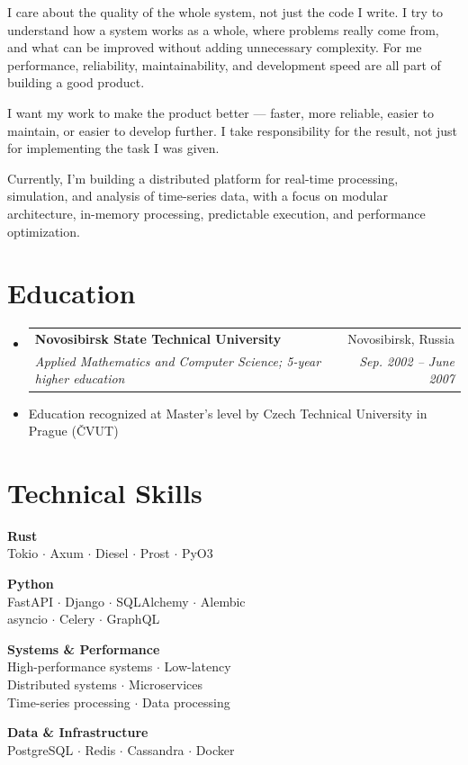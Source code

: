 \documentclass[letterpaper,11pt]{article}
\makeatletter
\newcommand{\resumeSubheading}[4]{
  \vspace{-1pt}\item
    \begin{tabular*}{0.97\textwidth}{l@{\extracolsep{\fill}}r}
      \textbf{#1} & #2 \\
      \textit{\small#3} & \textit{\small #4} \\
    \end{tabular*}\vspace{-5pt}
}
\newcommand{\resumeEducationNote}[1]{
  \vspace{-3pt}
  \item[]\footnotesize{#1}
  \vspace{-3pt}
}
\newcommand{\resumeSubHeadingListStart}{\begin{itemize}[leftmargin=*]}
\newcommand{\resumeSubHeadingListEnd}{\end{itemize}}
\makeatother
\begin{document}
I care about the quality of the whole system, not just the code I write. I try to understand how a system works as a whole, where problems really come from, and what can be improved without adding unnecessary complexity. For me performance, reliability, maintainability, and development speed are all part of building a good product.

I want my work to make the product better — faster, more reliable, easier to maintain, or easier to develop further. I take responsibility for the result, not just for implementing the task I was given.

Currently, I’m building a distributed platform for real-time processing, simulation, and analysis of time-series data, with a focus on modular architecture, in-memory processing, predictable execution, and performance optimization.

\section{Education}
  \resumeSubHeadingListStart
    \resumeSubheading
      {Novosibirsk State Technical University}{Novosibirsk, Russia}
      {Applied Mathematics and Computer Science; 5-year higher education}{Sep. 2002 -- June 2007}
    \resumeEducationNote
      {Education recognized at Master's level by Czech Technical University in Prague (ČVUT)}
  \resumeSubHeadingListEnd


\section{Technical Skills}

\begin{minipage}[t]{0.49\textwidth}
  \textbf{Rust}\\
  Tokio $\cdot$ Axum $\cdot$ Diesel $\cdot$ Prost $\cdot$ PyO3
\end{minipage}
\hfill
\begin{minipage}[t]{0.49\textwidth}
  \textbf{Python}\\
  FastAPI $\cdot$ Django $\cdot$ SQLAlchemy $\cdot$ Alembic\\
  asyncio $\cdot$ Celery $\cdot$ GraphQL
\end{minipage}

\vspace{6pt}

\begin{minipage}[t]{0.49\textwidth}
  \textbf{Systems \& Performance}\\
  High-performance systems $\cdot$ Low-latency\\
  Distributed systems $\cdot$ Microservices\\
  Time-series processing $\cdot$ Data processing
\end{minipage}
\hfill
\begin{minipage}[t]{0.49\textwidth}
  \textbf{Data \& Infrastructure}\\
  PostgreSQL $\cdot$ Redis $\cdot$ Cassandra $\cdot$ Docker
\end{minipage}
\end{document}
